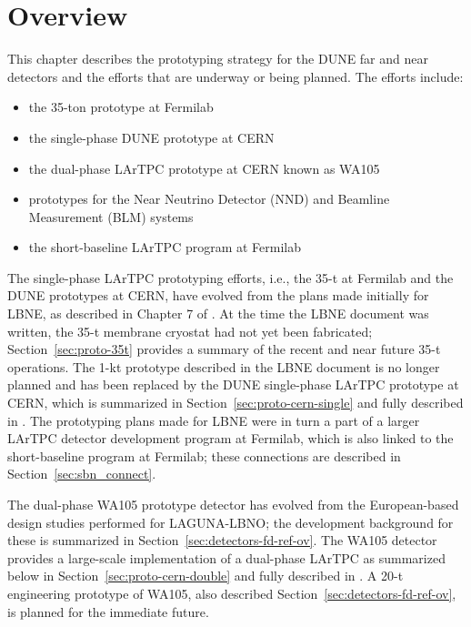 \section{Overview}
\label{sec:proto-overview}


This chapter describes the prototyping strategy for the DUNE  far and near detectors and the efforts that are underway or being planned.  The efforts include:
\begin{itemize}
\item the 35-ton prototype at Fermilab
\item the single-phase DUNE prototype at CERN
\item the dual-phase LArTPC prototype at CERN known as WA105
\item prototypes for the Near Neutrino Detector (NND) and Beamline Measurement (BLM) systems
\item the short-baseline LArTPC program at Fermilab
\end{itemize}

The single-phase LArTPC prototyping efforts, i.e., the 35-t at
Fermilab and the DUNE prototypes at CERN, have evolved from the plans
made initially for LBNE, as described in Chapter 7 of \anxlbnefd.  At
the time the LBNE document was written, the 35-t membrane cryostat had
not yet been fabricated; Section~\ref{sec:proto-35t} provides a
summary of the recent and near future 35-t operations.  The 1-kt
prototype described in the LBNE document is no longer planned and has
been replaced by the DUNE single-phase LArTPC prototype at CERN, which
is summarized in Section~\ref{sec:proto-cern-single} and fully
described in \anxcernproto.  The prototyping plans made for LBNE were
in turn a part of a larger LArTPC detector development program at
Fermilab, which is also linked to the short-baseline program at
Fermilab; these connections are described in
Section~\ref{sec:sbn_connect}.

The dual-phase WA105 prototype detector has evolved from the
European-based design studies performed for LAGUNA-LBNO; the
development background for these is summarized in
Section~\ref{sec:detectors-fd-ref-ov}.  The WA105 detector provides a
large-scale implementation of a dual-phase LArTPC 
as summarized below in
Section~\ref{sec:proto-cern-double} and fully described in
\anxdualtdr.  A 20-t engineering prototype of WA105, also described
Section~\ref{sec:detectors-fd-ref-ov}, is planned for the immediate
future.

